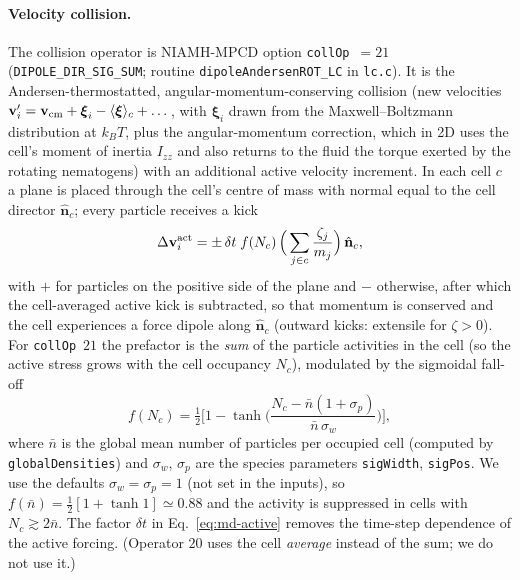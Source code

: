 \paragraph{Velocity collision.} The collision operator is NIAMH-MPCD option
\texttt{collOp}~$=21$ (\texttt{DIPOLE\_DIR\_SIG\_SUM}; routine \texttt{dipoleAndersenROT\_LC} in
\texttt{lc.c}). It is the Andersen-thermostatted, angular-momentum-conserving collision
(new velocities $\mathbf v_i'=\mathbf v_{\rm cm}+\boldsymbol\xi_i-\langle\boldsymbol\xi\rangle_c
+\dots$, with $\boldsymbol\xi_i$ drawn from the Maxwell--Boltzmann distribution at $k_BT$, plus the
angular-momentum correction, which in 2D uses the cell's moment of inertia $I_{zz}$ and also returns
to the fluid the torque exerted by the rotating nematogens) with an additional active velocity
increment. In each cell $c$ a plane is placed through the cell's centre of mass with normal equal to
the cell director $\hat{\mathbf n}_c$; every particle receives a kick
\begin{equation}
  \Delta\mathbf v_i^{\rm act}= \pm\,\delta t\;f(N_c)\,\Big(\sum_{j\in c}\frac{\zeta_j}{m_j}\Big)\,\hat{\mathbf n}_c ,
  \label{eq:md-active}
\end{equation}
with $+$ for particles on the positive side of the plane and $-$ otherwise, after which the
cell-averaged active kick is subtracted, so that momentum is conserved and the cell experiences a
force dipole along $\hat{\mathbf n}_c$ (outward kicks: extensile for $\zeta>0$). For
\texttt{collOp}~$21$ the prefactor is the \emph{sum} of the particle activities in the cell
(so the active stress grows with the cell occupancy $N_c$), modulated by the sigmoidal fall-off
\begin{equation}
  f(N_c)=\tfrac12\Big[1-\tanh\Big(\frac{N_c-\bar n(1+\sigma_p)}{\bar n\,\sigma_w}\Big)\Big],
  \label{eq:md-sigmoid}
\end{equation}
where $\bar n$ is the global mean number of particles per occupied cell (computed by
\texttt{globalDensities}) and $\sigma_w$, $\sigma_p$ are the species parameters
\texttt{sigWidth}, \texttt{sigPos}. We use the defaults $\sigma_w=\sigma_p=1$ (not set in the
inputs), so $f(\bar n)=\tfrac12[1+\tanh 1]\simeq0.88$ and the activity is suppressed in cells with
$N_c\gtrsim 2\bar n$. The factor $\delta t$ in Eq.~\eqref{eq:md-active} removes the time-step
dependence of the active forcing. (Operator $20$ uses the cell \emph{average} instead of the sum; we do
not use it.)

